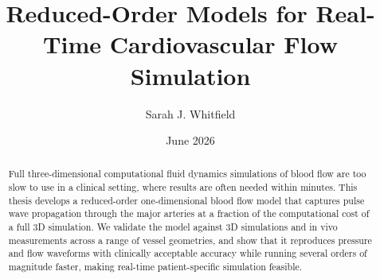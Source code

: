 \documentclass[a4paper]{phdthesis}
\begin{document}
\frontmatter
\title      {Reduced-Order Models for Real-Time Cardiovascular Flow Simulation}
\date       {June 2026}
\author     {Sarah J. Whitfield}

\maketitle

\begin{abstract}
Full three-dimensional computational fluid dynamics simulations of blood
flow are too slow to use in a clinical setting, where results are often
needed within minutes. This thesis develops a reduced-order one-dimensional
blood flow model that captures pulse wave propagation through the major
arteries at a fraction of the computational cost of a full 3D simulation.
We validate the model against 3D simulations and in vivo measurements
across a range of vessel geometries, and show that it reproduces pressure
and flow waveforms with clinically acceptable accuracy while running
several orders of magnitude faster, making real-time patient-specific
simulation feasible.
\end{abstract}

\tableofcontents
\listoffigures
\listoftables
\lstlistoflistings
{}
\mainmatter



\appendix


\backmatter


\end{document}
